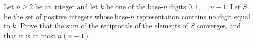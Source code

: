 Let $n\ge2$ be an integer and let $k$ be one of the base-$n$ digits $0,1,\dots,n-1$. Let $S$ be the set of positive integers whose base-$n$ representation contains no digit equal to $k$. Prove that the sum of the reciprocals of the elements of $S$ converges, and that it is at most $n(n-1)$.
